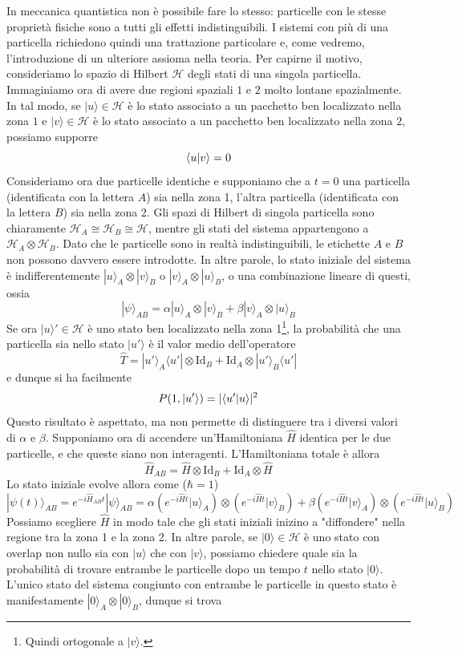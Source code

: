 \documentclass[a4paper, 11pt]{article}
\newcommand{\op}[1]{\hat{#1}}
\renewcommand{\H}{\mathcal{H}}
\newcommand{\id}{\mathrm{Id}}
\renewcommand{\op}[1]{\hat{#1}}
\newcommand{\ham}{\hat{H}}
\renewcommand{\ket}[1]{| #1\rangle}
\renewcommand{\bra}[1]{\langle #1|}
\begin{document}
In meccanica quantistica non è possibile fare lo stesso: particelle con le stesse proprietà fisiche sono a tutti gli effetti indistinguibili. I sistemi con più di una particella richiedono quindi una trattazione particolare e, come vedremo, l'introduzione di un ulteriore assioma nella teoria. Per capirne il motivo, consideriamo lo spazio di Hilbert $\H$ degli stati di una singola particella. Immaginiamo ora di avere due regioni spaziali $1$ e $2$ molto lontane spazialmente. In tal modo, se $\ket{u}\in\H$ è lo stato associato a un pacchetto ben localizzato nella zona $1$ e $\ket{v}\in\H$ è lo stato associato a un pacchetto ben localizzato nella zona $2$, possiamo supporre
\[\langle u\vert v\rangle=0\]
Consideriamo ora due particelle identiche e supponiamo che a $t=0$ una particella (identificata con la lettera $A$) sia nella zona 1, l'altra particella (identificata con la lettera $B$) sia nella zona 2. Gli spazi di Hilbert di singola particella sono chiaramente $\H_A\cong\H_B\cong\H$, mentre gli stati del sistema appartengono a $\H_A\otimes\H_B$. Dato che le particelle sono in realtà indistinguibili, le etichette $A$ e $B$ non possono davvero essere introdotte. In altre parole, lo stato iniziale del sistema è indifferentemente $\ket{u}_A\otimes\ket{v}_B$ o $\ket{v}_A\otimes\ket{u}_B$, o una combinazione lineare di questi, ossia
\[\ket{\psi}_{AB}=\alpha\ket{u}_A\otimes\ket{v}_B+\beta\ket{v}_A\otimes\ket{u}_B\]
Se ora $\ket{u}'\in\H$ è uno stato ben localizzato nella zona 1\footnote{Quindi ortogonale a $\ket{v}$.}, la probabilità che una particella sia nello stato $\ket{u'}$ è il valor medio dell'operatore
\[\op{T}=\ket{u'}_A\bra{u'}\otimes\id_B+\id_A\otimes\ket{u'}_B\bra{u'}\]
e dunque si ha facilmente
\[P(1,\ket{u'})=|\braket{u'}{u}|^2\]
Questo risultato è aspettato, ma non permette di distinguere tra i diversi valori di $\alpha$ e $\beta$. Supponiamo ora di accendere un'Hamiltoniana $\ham$ identica per le due particelle, e che queste siano non interagenti. L'Hamiltoniana totale è allora
\[\ham_{AB}=\ham\otimes\id_B+\id_A\otimes\ham\]
Lo stato iniziale evolve allora come ($\hbar=1$)
\[\ket{\psi(t)}_{AB}=e^{-i\ham_{AB}t}\ket{\psi}_{AB}=\alpha\left(e^{-i\ham t}\ket{u}_A\right)\otimes\left(e^{-i\ham t}\ket{v}_B\right)+\beta\left(e^{-i\ham t}\ket{v}_A\right)\otimes\left(e^{-i\ham t}\ket{u}_B\right)\]
Possiamo scegliere $\ham$ in modo tale che gli stati iniziali inizino a "diffondere" nella regione tra la zona 1 e la zona 2. In altre parole, se $\ket{0}\in\H$ è uno stato con overlap non nullo sia con $\ket{u}$ che con $\ket{v}$, possiamo chiedere quale sia la probabilità di trovare entrambe le particelle dopo un tempo $t$ nello stato $\ket{0}$. L'unico stato del sistema congiunto con entrambe le particelle in questo stato è manifestamente $\ket{0}_A\otimes\ket{0}_B$, dunque si trova
\end{document}
